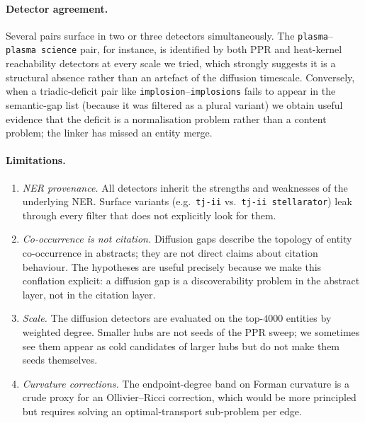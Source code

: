 \documentclass[11pt,a4paper]{article}
\newcommand{\code}[1]{\texttt{\small #1}}
\begin{document}
\paragraph{Detector agreement.} Several pairs surface in two or three detectors simultaneously. The \code{plasma}--\code{plasma science} pair, for instance, is identified by both PPR and heat-kernel reachability detectors at every scale we tried, which strongly suggests it is a structural absence rather than an artefact of the diffusion timescale. Conversely, when a triadic-deficit pair like \code{implosion}--\code{implosions} fails to appear in the semantic-gap list (because it was filtered as a plural variant) we obtain useful evidence that the deficit is a normalisation problem rather than a content problem; the linker has missed an entity merge.

\paragraph{Limitations.}
\begin{enumerate}
\item \emph{NER provenance.} All detectors inherit the strengths and weaknesses of the underlying NER. Surface variants (e.g.\ \code{tj-ii} vs.\ \code{tj-ii stellarator}) leak through every filter that does not explicitly look for them.
\item \emph{Co-occurrence is not citation.} Diffusion gaps describe the topology of entity co-occurrence in abstracts; they are not direct claims about citation behaviour. The hypotheses are useful precisely because we make this conflation explicit: a diffusion gap is a discoverability problem in the abstract layer, not in the citation layer.
\item \emph{Scale.} The diffusion detectors are evaluated on the top-$4000$ entities by weighted degree. Smaller hubs are not seeds of the PPR sweep; we sometimes see them appear as cold candidates of larger hubs but do not make them seeds themselves.
\item \emph{Curvature corrections.} The endpoint-degree band on Forman curvature is a crude proxy for an Ollivier--Ricci correction, which would be more principled but requires solving an optimal-transport sub-problem per edge.
\end{enumerate}
\end{document}
